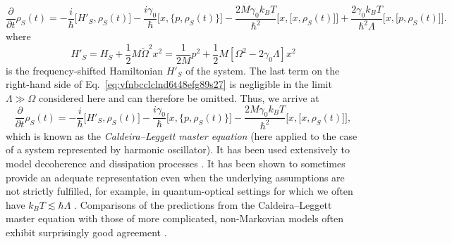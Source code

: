 \documentclass[3p,sort&compress]{elsarticle}
\newcommand{\I}{\ensuremath{i}}
\newcommand{\op}[1]{#1}
\begin{document}
%
\begin{equation}
\label{eq:vfnbcclclnd6t48efg89s27}
  \frac{\partial}{\partial t} \op{\rho}_S(t) 
  = -\frac{\I}{\hbar} \bigl[ \op{H}'_S, \op{\rho}_S(t) \bigr]
- \frac{\I \gamma_0}{\hbar} \bigl[ x, \bigl\{ p,
      \op{\rho}_S(t) \bigr\} \bigr] 
 - \frac{2 M\gamma_0 k_B T}{\hbar^2} \bigl[ x, \bigl[ x, \op{\rho}_S(t) \bigr]\bigr]  + \frac{2\gamma_0k_B T}{\hbar^2\Lambda} \bigl[ x, \bigl[ p, \op{\rho}_S(t) \bigr]\bigr].
\end{equation}
%
where 
%
\begin{equation}
  \op{H}'_S = \op{H}_S + \frac{1}{2}M
  \widetilde{\Omega}^2 x^2 = \frac{1}{2M}p^2 +
  \frac{1}{2}M\left[ \Omega^2 - 2\gamma_0 \Lambda \right]x^2
\end{equation}
%
is the frequency-shifted Hamiltonian $\op{H}'_S$ of the system. The last term on the right-hand side of Eq.~\eqref{eq:vfnbcclclnd6t48efg89s27} is negligible in the limit $\Lambda \gg \Omega$ considered here and can therefore be omitted. Thus, we arrive at 
%
\begin{equation}
\label{eq:vfnbcclclnd9s27}
  \frac{\partial}{\partial t} \op{\rho}_S(t) 
  = -\frac{\I}{\hbar} \bigl[ \op{H}'_S, \op{\rho}_S(t) \bigr]
  - \frac{\I \gamma_0}{\hbar} \bigl[ x, \bigl\{ p,
      \op{\rho}_S(t) \bigr\} \bigr] 
 - \frac{2 M\gamma_0 k_B T}{\hbar^2} \bigl[ x, \bigl[ x, \op{\rho}_S(t) \bigr]\bigr],
\end{equation}
%
which is known as the \emph{Caldeira--Leggett master equation} \cite{Caldeira:1983:on} (here applied to the case of a system represented by harmonic oscillator). It has been used extensively to model decoherence and dissipation processes 
\cite{Gallis:1990:un,Gallis:1992:im,Anglin:1997:za}. It has been shown to sometimes provide an adequate representation even when the underlying assumptions are not strictly fulfilled, for example, in quantum-optical settings for which we often have $k_B T \lesssim \hbar\Lambda$ \cite{Walls:1985:lm}. Comparisons of the predictions from the Caldeira--Leggett master equation with those of more complicated, non-Markovian models often exhibit surprisingly good agreement \cite{Paz:1993:ta}.
\end{document}
